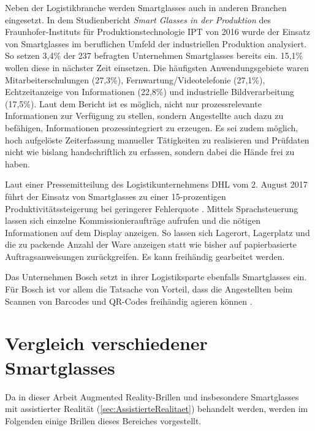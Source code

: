 Neben der Logistikbranche werden Smartglasses auch in anderen Branchen eingesetzt. In dem Studienbericht \emph{Smart Glasses in der Produktion} des Fraunhofer-Instituts für Produktionstechnologie IPT von 2016 \cite{Plutz} wurde der Einsatz von Smartglasses im beruflichen Umfeld der industriellen Produktion analysiert. So setzen 3,4\% der 237 befragten Unternehmen  Smartglasses bereits ein. 15,1\% wollen diese in nächster Zeit einsetzen. Die häufigsten Anwendungsgebiete waren Mitarbeiterschulungen (27,3\%), Fernwartung/Videotelefonie (27,1\%), Echtzeitanzeige von Informationen (22,8\%) und industrielle Bildverarbeitung (17,5\%). Laut dem Bericht ist es möglich, nicht nur 
prozessrelevante Informationen zur Verfügung zu stellen, sondern Angestellte auch dazu zu befähigen, Informationen prozessintegriert zu erzeugen. Es sei zudem möglich, hoch aufgelöste Zeiterfassung manueller Tätigkeiten zu realisieren und Prüfdaten nicht wie bislang handschriftlich zu erfassen, sondern dabei die Hände frei zu haben.

Laut einer Pressemitteilung des Logistikunternehmens DHL vom 2. August 2017 führt der Einsatz von Smartglasses zu einer 15-prozentigen Produktivitätssteigerung bei geringerer Fehlerquote \cite{DeutschePostDHLGroup2017}. Mittels Sprachsteuerung lassen sich einzelne Kommissionieraufträge aufrufen und die nötigen Informationen auf dem Display anzeigen. So lassen sich Lagerort, Lagerplatz und die zu packende Anzahl der Ware anzeigen statt wie bisher auf papierbasierte Auftragsanweisungen zurückgreifen. Es kann freihändig gearbeitet werden.

Das Unternehmen Bosch setzt in ihrer Logistiksparte ebenfalls Smartglasses ein. Für Bosch ist vor allem die Tatsache von Vorteil, dass die Angestellten beim Scannen von Barcodes und QR-Codes freihändig agieren können \cite{Spinger2014}. 
%
%
%
%
%
%
\section{Vergleich verschiedener Smartglasses}
\label{sec:VergleichSmartglasses}
Da in dieser Arbeit Augmented Reality-Brillen und insbesondere Smartglasses mit assistierter Realität (\ref{sec:AssistierteRealitaet}) behandelt werden, werden im Folgenden einige Brillen dieses Bereiches vorgestellt.
%
%
%
%
%
%
